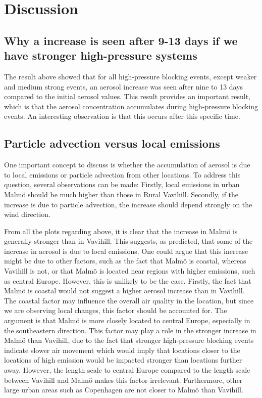 \newpage
\section{Discussion}
\subsection{Why a increase is seen after 9-13 days if we have stronger high-pressure systems}
The result above showed that for all high-pressure blocking events, except weaker and medium strong events, an aerosol increase was seen after nine to 13 days compared to the initial aerosol values. This result provides an important result, which is that the aerosol concentration accumulates during high-pressure blocking events. An interesting observation is that this occurs after this specific time. 

\subsection{Particle advection versus local emissions}
One important concept to discuss is whether the accumulation of aerosol is due to local emissions or particle advection from other locations. To address this question, several observations can be made: Firstly, local emissions in urban Malmö should be much higher than those in Rural Vavihill. Secondly, if the increase is due to particle advection, the increase should depend strongly on the wind direction. 

From all the plots regarding \PM above, it is clear that the increase in Malmö is generally stronger than in Vavihill. This suggests, as predicted, that some of the increase in aerosol is due to local emissions. One could argue that this increase might be due to other factors, such as the fact that Malmö is coastal, whereas Vavihill is not, or that Malmö is located near regions with higher emissions, such as central Europe. However, this is unlikely to be the case. Firstly, the fact that Malmö is coastal would not suggest a higher aerosol increase than in Vavihill. The coastal factor may influence the overall air quality in the location, but since we are observing local changes, this factor should be accounted for. The argument is that Malmö is more closely located to central Europe, especially in the southeastern direction. This factor may play a role in the stronger increase in Malmö than Vavihill, due to the fact that stronger high-pressure blocking events indicate slower air movement which would imply  that locations closer to the locations of high emission would be impacted stronger than locations further away. However, the length scale to central Europe compared to the length scale between Vavihill and Malmö makes this factor irrelevant. Furthermore, other large urban areas such as Copenhagen are not closer to Malmö than Vavihill. 

